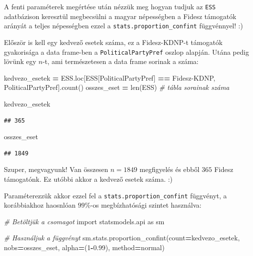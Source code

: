 \documentclass[
]{book}
\newenvironment{Shaded}{\begin{snugshade}}{\end{snugshade}}
\newcommand{\BuiltInTok}[1]{#1}
\newcommand{\CommentTok}[1]{\textcolor[rgb]{0.56,0.35,0.01}{\textit{#1}}}
\newcommand{\DecValTok}[1]{\textcolor[rgb]{0.00,0.00,0.81}{#1}}
\newcommand{\FloatTok}[1]{\textcolor[rgb]{0.00,0.00,0.81}{#1}}
\newcommand{\ImportTok}[1]{#1}
\newcommand{\NormalTok}[1]{#1}
\newcommand{\OperatorTok}[1]{\textcolor[rgb]{0.81,0.36,0.00}{\textbf{#1}}}
\newcommand{\StringTok}[1]{\textcolor[rgb]{0.31,0.60,0.02}{#1}}
\begin{document}
A fenti paraméterek megértése után nézzük meg hogyan tudjuk az \texttt{ESS} adatbázison keresztül megbecsülni a magyar népességben a Fidesz támogatók arányát a teljes népességben ezzel a \texttt{stats.proportion\_confint} függvénnyel! :)

Először is kell egy kedvező esetek száma, ez a Fidesz-KDNP-t támogatók gyakorisága a data frame-ben a \texttt{PoliticalPartyPref} oszlop alapján. Utána pedig lövünk egy \(n\)-t, ami természetesen a data frame sorinak a száma:

\begin{Shaded}
\begin{Highlighting}[]
\NormalTok{kedvezo\_esetek }\OperatorTok{=}\NormalTok{ ESS.loc[ESS[}\StringTok{\textquotesingle{}PoliticalPartyPref\textquotesingle{}}\NormalTok{] }\OperatorTok{==} \StringTok{\textquotesingle{}Fidesz{-}KDNP\textquotesingle{}}\NormalTok{, }\StringTok{\textquotesingle{}PoliticalPartyPref\textquotesingle{}}\NormalTok{].count()}
\NormalTok{osszes\_eset }\OperatorTok{=} \BuiltInTok{len}\NormalTok{(ESS) }\CommentTok{\# tábla sorainak száma}

\NormalTok{kedvezo\_esetek}
\end{Highlighting}
\end{Shaded}

\begin{verbatim}
## 365
\end{verbatim}

\begin{Shaded}
\begin{Highlighting}[]
\NormalTok{osszes\_eset}
\end{Highlighting}
\end{Shaded}

\begin{verbatim}
## 1849
\end{verbatim}

Szuper, megvagyunk! Van összesen \(n=1849\) megfigyelés és ebből \(365\) Fidesz támogatónk. Ez utóbbi akkor a kedvező esetek száma. :)

Paraméterezzük akkor ezzel fel a \texttt{stats.proportion\_confint} függvényt, a korábbiakhoz haosnlóan \(99\%\)-os megbízhatósági szintet használva:

\begin{Shaded}
\begin{Highlighting}[]
\CommentTok{\# Betöltjük a csomagot}
\ImportTok{import}\NormalTok{ statsmodels.api }\ImportTok{as}\NormalTok{ sm}

\CommentTok{\# Használjuk a függvényt}
\NormalTok{sm.stats.proportion\_confint(count}\OperatorTok{=}\NormalTok{kedvezo\_esetek, nobs}\OperatorTok{=}\NormalTok{osszes\_eset, alpha}\OperatorTok{=}\NormalTok{(}\DecValTok{1}\OperatorTok{{-}}\FloatTok{0.99}\NormalTok{), method}\OperatorTok{=}\StringTok{\textquotesingle{}normal\textquotesingle{}}\NormalTok{)}
\end{Highlighting}
\end{Shaded}
\end{document}

